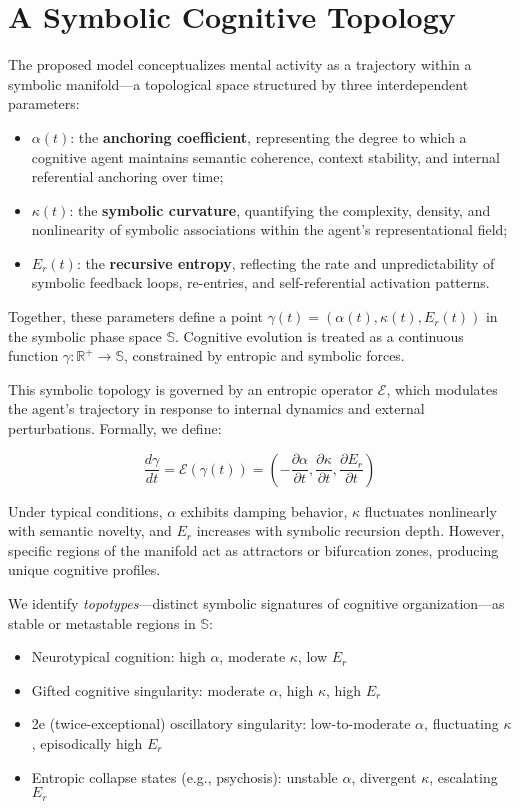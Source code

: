 


\section*{A Symbolic Cognitive Topology}

The proposed model conceptualizes mental activity as a trajectory within a symbolic manifold—a topological space structured by three interdependent parameters:

\begin{itemize}
  \item $\alpha(t)$: the \textbf{anchoring coefficient}, representing the degree to which a cognitive agent maintains semantic coherence, context stability, and internal referential anchoring over time;
  \item $\kappa(t)$: the \textbf{symbolic curvature}, quantifying the complexity, density, and nonlinearity of symbolic associations within the agent's representational field;
  \item $E_r(t)$: the \textbf{recursive entropy}, reflecting the rate and unpredictability of symbolic feedback loops, re-entries, and self-referential activation patterns.
\end{itemize}

Together, these parameters define a point $\gamma(t) = (\alpha(t), \kappa(t), E_r(t))$ in the symbolic phase space $\mathbb{S}$. Cognitive evolution is treated as a continuous function $\gamma: \mathbb{R}^+ \rightarrow \mathbb{S}$, constrained by entropic and symbolic forces.

This symbolic topology is governed by an entropic operator $\mathcal{E}$, which modulates the agent's trajectory in response to internal dynamics and external perturbations. Formally, we define:

\[
\frac{d\gamma}{dt} = \mathcal{E}(\gamma(t)) = \left( -\frac{\partial \alpha}{\partial t}, \frac{\partial \kappa}{\partial t}, \frac{\partial E_r}{\partial t} \right)
\]

Under typical conditions, $\alpha$ exhibits damping behavior, $\kappa$ fluctuates nonlinearly with semantic novelty, and $E_r$ increases with symbolic recursion depth. However, specific regions of the manifold act as attractors or bifurcation zones, producing unique cognitive profiles.

We identify \emph{topotypes}—distinct symbolic signatures of cognitive organization—as stable or metastable regions in $\mathbb{S}$:

\begin{itemize}
  \item Neurotypical cognition: high $\alpha$, moderate $\kappa$, low $E_r$
  \item Gifted cognitive singularity: moderate $\alpha$, high $\kappa$, high $E_r$
  \item 2e (twice-exceptional) oscillatory singularity: low-to-moderate $\alpha$, fluctuating $\kappa$, episodically high $E_r$
  \item Entropic collapse states (e.g., psychosis): unstable $\alpha$, divergent $\kappa$, escalating $E_r$
\end{itemize}

